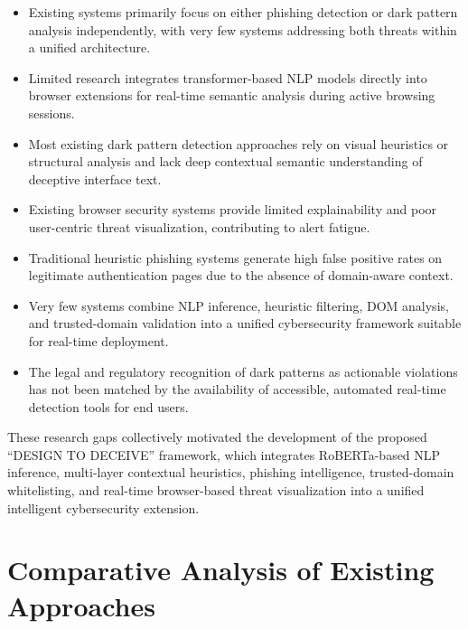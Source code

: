 \begin{itemize}
\item Existing systems primarily focus on either phishing detection or dark pattern analysis independently, with very few systems addressing both threats within a unified architecture.
\item Limited research integrates transformer-based NLP models directly into browser extensions for real-time semantic analysis during active browsing sessions.
\item Most existing dark pattern detection approaches rely on visual heuristics or structural analysis and lack deep contextual semantic understanding of deceptive interface text.
\item Existing browser security systems provide limited explainability and poor user-centric threat visualization, contributing to alert fatigue.
\item Traditional heuristic phishing systems generate high false positive rates on legitimate authentication pages due to the absence of domain-aware context.
\item Very few systems combine NLP inference, heuristic filtering, DOM analysis, and trusted-domain validation into a unified cybersecurity framework suitable for real-time deployment.
\item The legal and regulatory recognition of dark patterns as actionable violations has not been matched by the availability of accessible, automated real-time detection tools for end users.
\end{itemize}

These research gaps collectively motivated the development of the proposed ``DESIGN TO DECEIVE'' framework, which integrates RoBERTa-based NLP inference, multi-layer contextual heuristics, phishing intelligence, trusted-domain whitelisting, and real-time browser-based threat visualization into a unified intelligent cybersecurity extension.


\section{Comparative Analysis of Existing Approaches}

